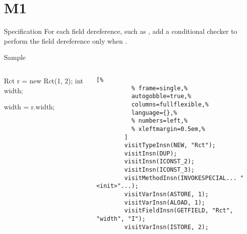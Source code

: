 \section{M1}

\begin{frame}{Specification}
  \justifying
  For each \alert<2>{field} dereference, such as , add a conditional checker to perform the field dereference only when .
\end{frame}

\begin{frame}[fragile]{Sample}
  \begin{columns}
    \begin{column}{0.35\textwidth}
      \begin{Java}[%
        ]
        Rct r = new Rct(1, 2);
        int width;

        width = r.width;
      \end{Java}
    \end{column}
    \begin{column}{0.60\textwidth}
      \small
      \begin{lstlisting}[%
          % frame=single,%
          autogobble=true,%
          columns=fullflexible,%
          language={},%
          % numbers=left,%
          % xleftmargin=0.5em,%
        ]
        visitTypeInsn(NEW, "Rct");
        visitInsn(DUP);
        visitInsn(ICONST_2);
        visitInsn(ICONST_3);
        visitMethodInsn(INVOKESPECIAL... "<init>"...);
        visitVarInsn(ASTORE, 1);
        visitVarInsn(ALOAD, 1);
        visitFieldInsn(GETFIELD, "Rct", "width", "I");
        visitVarInsn(ISTORE, 2);
    \end{lstlisting}
    \end{column}
  \end{columns}
\end{frame}

